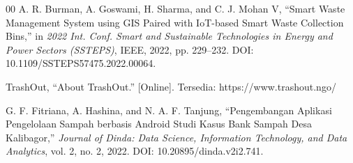 \documentclass[conference]{IEEEtran}
\begin{document}
\begin{thebibliography}{00}
     A. R. Burman, A. Goswami, H. Sharma, and C. J. Mohan V, ``Smart Waste Management System using GIS Paired with IoT-based Smart Waste Collection Bins,'' in \textit{2022 Int. Conf. Smart and Sustainable Technologies in Energy and Power Sectors (SSTEPS)}, IEEE, 2022, pp. 229--232. DOI: 10.1109/SSTEPS57475.2022.00064.

     TrashOut, ``About TrashOut.'' [Online]. Tersedia: https://www.trashout.ngo/

     G. F. Fitriana, A. Hashina, and N. A. F. Tanjung, ``Pengembangan Aplikasi Pengelolaan Sampah berbasis Android Studi Kasus Bank Sampah Desa Kalibagor,'' \textit{Journal of Dinda: Data Science, Information Technology, and Data Analytics}, vol. 2, no. 2, 2022. DOI: 10.20895/dinda.v2i2.741.

\end{thebibliography}
\end{document}

